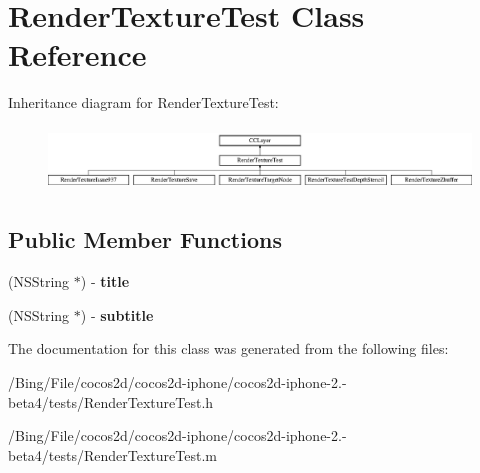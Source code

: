 \hypertarget{interface_render_texture_test}{\section{Render\-Texture\-Test Class Reference}
\label{interface_render_texture_test}
}
Inheritance diagram for Render\-Texture\-Test\-:\begin{figure}[H]
\begin{center}
\leavevmode
\includegraphics[height=1.705584cm]{interface_render_texture_test}
\end{center}
\end{figure}
\subsection*{Public Member Functions}
\begin{DoxyCompactItemize}
\item 
\hypertarget{interface_render_texture_test_ac1990fa2b2bfd18ea1aef58e99f7ef60}{(N\-S\-String $\ast$) -\/ {\bfseries title}}\label{interface_render_texture_test_ac1990fa2b2bfd18ea1aef58e99f7ef60}

\item 
\hypertarget{interface_render_texture_test_a69d68b345993dfd549f5d6dbffdb14ea}{(N\-S\-String $\ast$) -\/ {\bfseries subtitle}}\label{interface_render_texture_test_a69d68b345993dfd549f5d6dbffdb14ea}

\end{DoxyCompactItemize}


The documentation for this class was generated from the following files\-:\begin{DoxyCompactItemize}
\item 
/\-Bing/\-File/cocos2d/cocos2d-\/iphone/cocos2d-\/iphone-\/2.-\/beta4/tests/Render\-Texture\-Test.\-h\item 
/\-Bing/\-File/cocos2d/cocos2d-\/iphone/cocos2d-\/iphone-\/2.-\/beta4/tests/Render\-Texture\-Test.\-m\end{DoxyCompactItemize}
